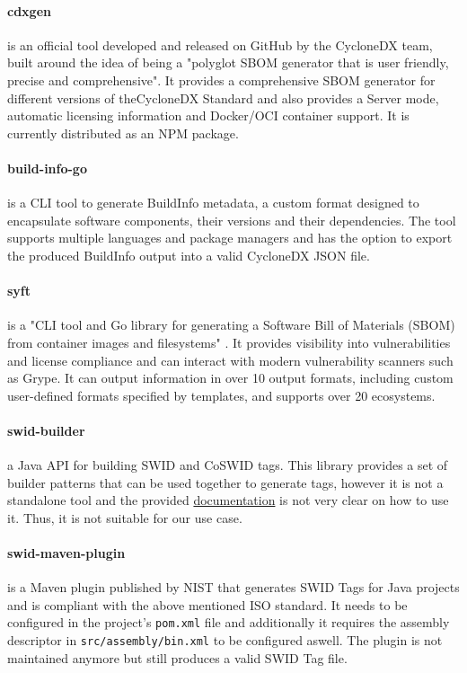 \paragraph{cdxgen} is an official tool developed and released on GitHub by the CycloneDX team, built around the idea of being a "polyglot SBOM generator that is user friendly, precise and comprehensive". It provides a comprehensive SBOM generator for different versions of theCycloneDX Standard and also provides a Server mode, automatic licensing information and Docker/OCI container support. It is currently distributed as an NPM package.

\paragraph{build-info-go} is a CLI tool to generate BuildInfo metadata, a custom format designed to encapsulate software components, their versions and their dependencies. The tool supports multiple languages and package managers and has the option to export the produced BuildInfo output into a valid CycloneDX JSON file.

\paragraph{syft} is a "CLI tool and Go library for generating a Software Bill of Materials (SBOM) from container images and filesystems" \cite{repository:cyclonedx:syft}. It provides visibility into vulnerabilities and license compliance and can interact with modern vulnerability scanners such as Grype. It can output information in over 10 output formats, including custom user-defined formats specified by templates, and supports over 20 ecosystems.

\paragraph{swid-builder} a Java API for building SWID and CoSWID tags. This library provides a set of builder patterns that can be used together to generate tags, however it is not a standalone tool and the provided \href{https://pages.nist.gov/swid-tools/swid-builder/apidocs/index.html}{documentation} is not very clear on how to use it. Thus, it is not suitable for our use case.

\paragraph{swid-maven-plugin} is a Maven plugin published by NIST \cite{repository:swid-maven-plugin} that generates SWID Tags for Java projects and is compliant with the above mentioned ISO standard. It needs to be configured in the project's \verb|pom.xml| file and additionally it requires the assembly descriptor in \verb|src/assembly/bin.xml| to be configured aswell. The plugin is not maintained anymore but still produces a valid SWID Tag file.

